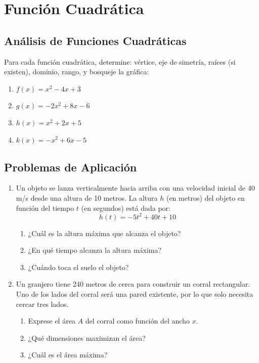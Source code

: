 \documentclass[12pt,a4paper]{article}
\begin{document}
\section{Función Cuadrática}

\subsection{Análisis de Funciones Cuadráticas}
Para cada función cuadrática, determine: vértice, eje de simetría, raíces (si existen), dominio, rango, y bosqueje la gráfica:

\begin{enumerate}
    \item $f(x) = x^2 - 4x + 3$
    \item $g(x) = -2x^2 + 8x - 6$
    \item $h(x) = x^2 + 2x + 5$
    \item $k(x) = -x^2 + 6x - 5$
\end{enumerate}

\subsection{Problemas de Aplicación}
\begin{enumerate}
    \item Un objeto se lanza verticalmente hacia arriba con una velocidad inicial de 40 m/s desde una altura de 10 metros. La altura $h$ (en metros) del objeto en función del tiempo $t$ (en segundos) está dada por:
    $$h(t) = -5t^2 + 40t + 10$$
    \begin{enumerate}
        \item ¿Cuál es la altura máxima que alcanza el objeto?
        \item ¿En qué tiempo alcanza la altura máxima?
        \item ¿Cuándo toca el suelo el objeto?
    \end{enumerate}
    
    \item Un granjero tiene 240 metros de cerca para construir un corral rectangular. Uno de los lados del corral será una pared existente, por lo que solo necesita cercar tres lados.
    \begin{enumerate}
        \item Exprese el área $A$ del corral como función del ancho $x$.
        \item ¿Qué dimensiones maximizan el área?
        \item ¿Cuál es el área máxima?
    \end{enumerate}
\end{enumerate}
\end{document}
